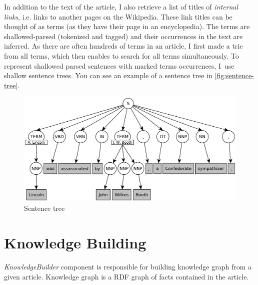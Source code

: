 \documentclass[12pt, twoside]{fithesis2}
\renewcommand{\_}{\leavevmode \kern0.07em\vbox{\hrule width0.4em}}
\begin{document}
In addition to the text of the article, I also retrieve a list of titles of \textit{internal links}, i.e. links to another pages on the Wikipedia.
These link titles can be thought of as terms (as they have their page in an encyclopedia).
The terms are shallowed-parsed (tokenized and tagged)
and their occurrences in the text are inferred.
As there are often hundreds of terms in an article,
I first made a trie from all terms, which then enables to search for all terms simultaneously.
To represent shallowed parsed sentences with marked terms occurrences,
I~use shallow sentence trees.
You can see an example of a sentence tree in \autoref{fig:sentence-tree}.
\begin{figure}[h]
  \centering
  \includegraphics[width=\textwidth]{images/sentence-tree.pdf}
  \caption{Sentence tree}
  \label{fig:sentence-tree}
\end{figure}

\section{Knowledge Building}
\label{sec:smartoo-knowledge}

\textit{KnowledgeBuilder} component is responsible for building knowledge graph from a given article.
Knowledge graph is a RDF graph of facts contained in the article.

\end{document}
